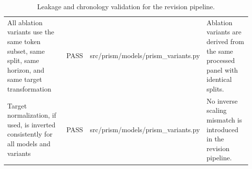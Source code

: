 \begin{table}[htbp]
\begin{tabular}{llll}
All ablation variants use the same token subset, same split, same horizon, and same target transformation & PASS & src/prism/models/prism_variants.py & Ablation variants are derived from the same processed panel with identical splits. \\
Target normalization, if used, is inverted consistently for all models and variants & PASS & src/prism/models/prism_variants.py & No inverse scaling mismatch is introduced in the revision pipeline. \\
\hline
\end{tabular}
\caption{Leakage and chronology validation for the revision pipeline.}
\label{leakage_audit_report}
\end{table}